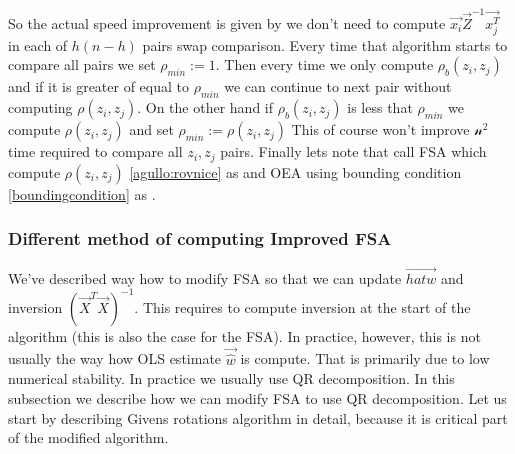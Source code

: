 So the actual speed improvement is given by we don't need to compute $\vec{x_i}\vec{Z}^{-1}\vec{x_j^T}$ in each of $h(n-h)$ pairs swap comparison. Every time that algorithm starts to compare all pairs we set $\rho_{min} :=1$. Then every time we only compute $\rho_b(z_i, z_j)$ and if it is greater of equal to $\rho_{min}$ we can continue to next pair without computing $\rho(z_i, z_j)$. On the other hand if $\rho_b(z_i, z_j)$ is less that  $\rho_{min}$ we compute $\rho(z_i, z_j)$ and set $\rho_{min} := \rho(z_i, z_j)$ This of course won't improve $\mathcal{n^2}$ time required to compare all $z_i, z_j$ pairs.
Finally lets note that \cite{agullo2001new} call FSA  which compute $\rho(z_i, z_j)$  \ref{agullo:rovnice} as  and OEA using bounding condition \ref{boundingcondition} as  .
























\subsubsection*{Different method of computing Improved FSA}

We've described way how to modify FSA so that we can update $\vec{hat{w}}$ and inversion $(\vec{X}^T \vec{X})^{-1}$. This requires to compute inversion at the start of the algorithm (this is also the case for the FSA). In practice, however, this is not usually the way how OLS estimate $\vec{\hat{w}}$ is compute. That is primarily due to low numerical stability. In practice we usually use QR decomposition. In this subsection we describe how we can modify FSA to use QR decomposition. Let us start by describing Givens rotations algorithm in detail, because it is critical part of the modified algorithm. 



